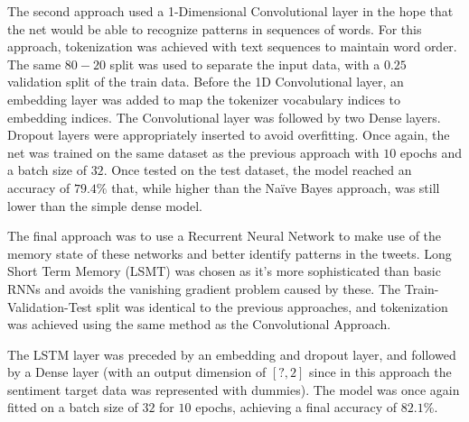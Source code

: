 \documentclass{article}
\begin{document}

  The second approach used a 1-Dimensional Convolutional layer in the
  hope that the net would be able to recognize patterns in sequences
  of words. For this approach, tokenization was achieved with text
  sequences to maintain word order. The same $80-20$ split was used to
  separate the input data, with a $0.25$ validation split of the train
  data. Before the 1D Convolutional layer, an embedding layer was
  added to map the tokenizer vocabulary indices to embedding
  indices. The Convolutional layer was followed by two Dense
  layers. Dropout layers were appropriately inserted to avoid
  overfitting. Once again, the net was trained on the same dataset as
  the previous approach with $10$ epochs and a batch size of
  $32$. Once tested on the test dataset, the model reached an accuracy
  of $79.4\%$ that, while higher than the Naïve Bayes approach, was
  still lower than the simple dense model.%

  
  The final approach was to use a Recurrent Neural Network to make use
  of the memory state of these networks and better identify patterns
  in the tweets. Long Short Term Memory (LSMT) was chosen as it’s more
  sophisticated than basic RNNs and avoids the vanishing gradient
  problem caused by these. The Train-Validation-Test split was
  identical to the previous approaches, and tokenization was achieved
  using the same method as the Convolutional Approach.%

  The LSTM layer was preceded by an embedding and dropout layer, and
  followed by a Dense layer (with an output dimension of $[?,2]$ since
  in this approach the sentiment target data was represented with
  dummies). The model was once again fitted on a batch size of $32$
  for $10$ epochs, achieving a final accuracy of $82.1\%$.%
\end{document}
